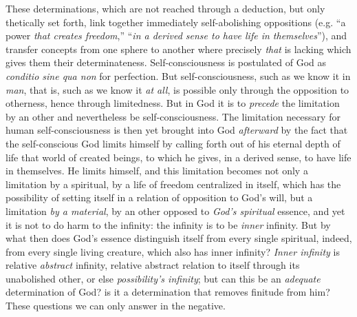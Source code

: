 \documentclass[12pt,a4paper]{book}
\begin{document}
These determinations, which are not reached through a deduction, but only thetically
set forth, link together immediately self-abolishing oppositions (e.g. ``a power \emph{that
creates freedom},'' ``\emph{in a derived sense to have life in themselves}''), and transfer
concepts from one sphere to another where precisely \emph{that} is lacking which gives them
their determinateness. Self-consciousness is postulated of God as \textit{conditio
sine qua non} for perfection. But self-consciousness, such as we know it in
\emph{man}, that is, such as we know it \emph{at all}, is possible only through the
opposition to otherness, hence through limitedness. But in God it is to \emph{precede} the
limitation by an other and nevertheless be self-consciousness. The limitation
necessary for human self-consciousness is then yet brought into God \emph{afterward}
by the fact that the self-conscious God limits himself by calling forth out of his
eternal depth of life that world of created beings, to which he gives, in a derived
sense, to have life in themselves. He limits himself, and this limitation becomes not
only a limitation by a spiritual, by a life of freedom centralized in itself, which
has the possibility of setting itself in a relation of opposition to God's will, but
a limitation \emph{by a material}, by an other opposed to \emph{God's spiritual} essence, and yet
it is not to do harm to the infinity: the infinity is to be \emph{inner} infinity.
But by what then does God's essence distinguish itself from every single spiritual,
indeed, from every single living creature, which also has inner infinity? \emph{Inner
infinity} is relative \emph{abstract} infinity, relative abstract relation to itself through
its unabolished other, or else \emph{possibility's infinity}; but can this be an \emph{adequate}
determination of God? is it a determination that removes finitude from him? These
questions we can only answer in the negative.
\end{document}

